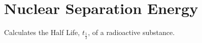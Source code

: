 \hypertarget{group___nuclear_separation_energy}{}\section{Nuclear Separation Energy}
\label{group___nuclear_separation_energy}
Calculates the Half Life, $t_{\frac{1}{2}}$, of a radioactive substance. 
